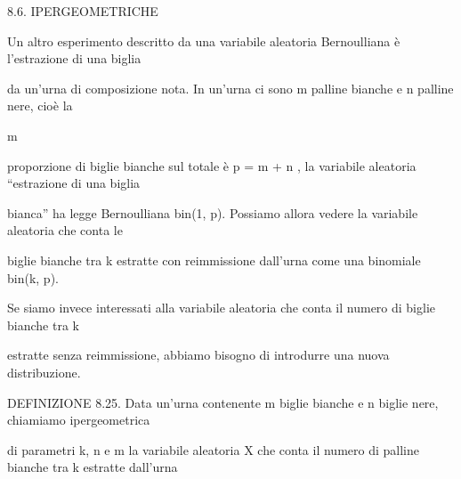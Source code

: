 \documentclass[a4paper,portrait,12pt]{article}
\begin{document}
\begin{flushleft}
8.6. IPERGEOMETRICHE
\end{flushleft}


\begin{flushleft}
Un altro esperimento descritto da una variabile aleatoria Bernoulliana \`{e} l'estrazione di una biglia
\end{flushleft}


\begin{flushleft}
da un'urna di composizione nota. In un'urna ci sono m palline bianche e n palline nere, cio\`{e} la
\end{flushleft}


\begin{flushleft}
m
\end{flushleft}


\begin{flushleft}
proporzione di biglie bianche sul totale \`{e} p = m + n , la variabile aleatoria {``}estrazione di una biglia
\end{flushleft}


\begin{flushleft}
bianca'' ha legge Bernoulliana bin(1, p). Possiamo allora vedere la variabile aleatoria che conta le
\end{flushleft}


\begin{flushleft}
biglie bianche tra k estratte con reimmissione dall'urna come una binomiale bin(k, p).
\end{flushleft}


\begin{flushleft}
Se siamo invece interessati alla variabile aleatoria che conta il numero di biglie bianche tra k
\end{flushleft}


\begin{flushleft}
estratte senza reimmissione, abbiamo bisogno di introdurre una nuova distribuzione.
\end{flushleft}


\begin{flushleft}
DEFINIZIONE 8.25. Data un'urna contenente m biglie bianche e n biglie nere, chiamiamo ipergeometrica
\end{flushleft}


\begin{flushleft}
di parametri k, n e m la variabile aleatoria X che conta il numero di palline bianche tra k estratte dall'urna
\end{flushleft}
\end{document}
